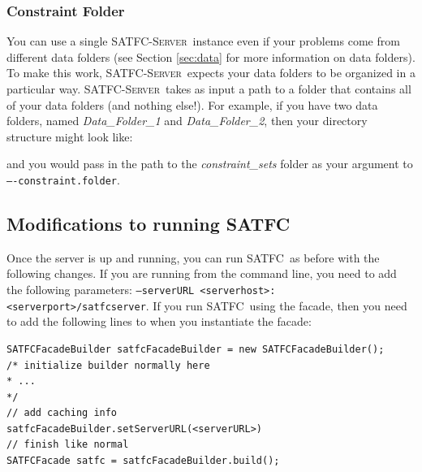 \documentclass[
10pt, %
letterpaper, %
oneside, %
headinclude,footinclude, %
BCOR5mm, %
needspace, %
]{scrartcl}
\newcommand{\SATFC}{\textsc{SATFC}~}
\newcommand{\SATFCServer}{\textsc{SATFC-Server}~}
\begin{document}
\subsubsection{Constraint Folder}\label{subsubsec:ConstraintFolder}
You can use a single \SATFCServer instance even if your problems come from different data folders (see Section \ref{sec:data} for more information on data folders). To make this work, \SATFCServer expects your data folders to be organized in a particular way. \SATFCServer takes as input a path to a folder that contains all of your data folders (and nothing else!). For example, if you have two data folders, named \textit{Data\_Folder\_1} and \textit{Data\_Folder\_2}, then your directory structure might look like:


and you would pass in the path to the \textit{constraint\_sets} folder as your argument to \texttt{----constraint.folder}.

\subsection{Modifications to running \SATFC}
Once the server is up and running, you can run \SATFC as before with the following changes. If you are running from the command line, you need to add the following parameters: \texttt{---serverURL <serverhost>:<serverport>/satfcserver}. If you run \SATFC using the facade, then you need to add the following lines to when you instantiate the facade:

\begin{verbatim}
SATFCFacadeBuilder satfcFacadeBuilder = new SATFCFacadeBuilder();
/* initialize builder normally here
* ...
*/
// add caching info
satfcFacadeBuilder.setServerURL(<serverURL>)
// finish like normal
SATFCFacade satfc = satfcFacadeBuilder.build();
\end{verbatim}
\end{document}
